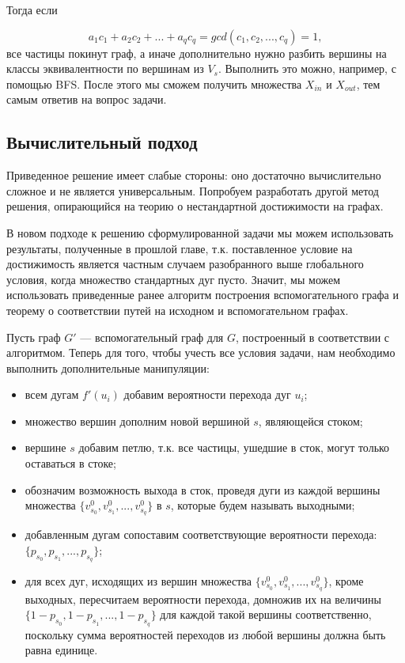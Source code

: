 Тогда если 

\begin{equation*}
a_1c_1 + a_2c_2 + ... + a_qc_q = gcd(c_1, c_2, ... , c_q) = 1,
\end{equation*}	все частицы покинут граф, а иначе дополнительно нужно разбить вершины на классы эквивалентности по вершинам из $V_s$. Выполнить это можно, например, с помощью BFS. После этого мы сможем получить множества $X_{in}$ и $X_{out}$, тем самым ответив на вопрос задачи. 

\subsection{Вычислительный подход}

Приведенное решение имеет слабые стороны: оно достаточно вычислительно сложное и не является универсальным. Попробуем разработать другой метод решения, опирающийся на теорию о нестандартной достижимости на графах. 

В новом подходе к решению сформулированной задачи мы можем использовать результаты, полученные в прошлой главе, т.к. поставленное условие на достижимость является частным случаем разобранного выше глобального условия, когда множество стандартных дуг пусто. Значит, мы можем использовать приведенные ранее алгоритм построения вспомогательного графа и теорему о соответствии путей на исходном и вспомогательном графах.  

Пусть граф $G'$ --- вспомогательный граф для $G$, построенный в соответствии с алгоритмом. Теперь для того, чтобы учесть все условия задачи, нам необходимо выполнить дополнительные манипуляции:

\begin{itemize}
	\item всем дугам $f'(u_i)$ добавим вероятности перехода дуг $u_i$;
	\item множество вершин дополним новой вершиной $s$, являющейся стоком;
	\item вершине $s$ добавим петлю, т.к. все частицы, ушедшие в сток, могут только оставаться в стоке;
	\item обозначим возможность выхода в сток, проведя дуги из каждой вершины множества $\{v^0_{s_0}, v^0_{s_1}, ... , v^0_{s_q}\}$ в $s$, которые будем называть выходными;
	\item добавленным дугам сопоставим соответствующие вероятности перехода: $\{p_{s_0}, p_{s_1}, ... , p_{s_q}\}$;
	\item для всех дуг, исходящих из вершин множества $\{v^0_{s_0}, v^0_{s_1}, ... , v^0_{s_q}\}$, кроме выходных, пересчитаем вероятности перехода, 
	домножив их на величины $\{ 1 - p_{s_0}, 1 - p_{s_1}, ... , 1 - p_{s_q}\}$ для каждой такой вершины соответственно, поскольку сумма вероятностей переходов из любой вершины должна быть равна единице.
\end{itemize}	

